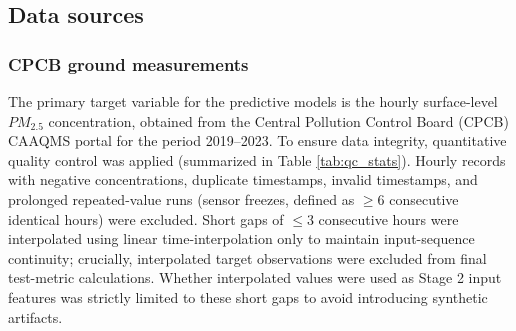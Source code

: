 \subsection{Data sources}

\subsubsection{CPCB ground measurements}
The primary target variable for the predictive models is the hourly surface-level $PM_{2.5}$ concentration, obtained from the Central Pollution Control Board (CPCB) CAAQMS portal for the period 2019--2023. To ensure data integrity, quantitative quality control was applied (summarized in Table \ref{tab:qc_stats}). Hourly records with negative concentrations, duplicate timestamps, invalid timestamps, and prolonged repeated-value runs (sensor freezes, defined as $\ge 6$ consecutive identical hours) were excluded. Short gaps of $\le 3$ consecutive hours were interpolated using linear time-interpolation only to maintain input-sequence continuity; crucially, interpolated target observations were excluded from final test-metric calculations. Whether interpolated values were used as Stage 2 input features was strictly limited to these short gaps to avoid introducing synthetic artifacts.

\begin{table}[h]
\centering
\caption{Quantitative summary of the data quality control pipeline.}
\label{tab:qc_stats}
\end{table}

